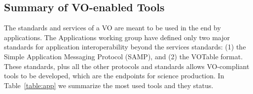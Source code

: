 \subsection{Summary of VO-enabled Tools }

The standards and services of a VO are meant to be used in the end 
by applications. The Applications working group have defined only two major
standards for application interoperability beyond the services standards: 
(1) the Simple Application Messaging Protocol (SAMP), and (2) the VOTable
format. These standards, plus all the other protocols and standards 
allows VO-compliant tools to be developed, which are the endpoints for
science production. In Table~\ref{table:app} we summarize the most used tools
and they status.


